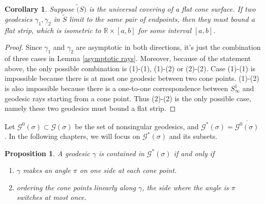 \documentclass[reqno]{amsart}
\theoremstyle{plain}
\newtheorem{cor}[thm]{Corollary}
\newtheorem{prop}[thm]{Proposition}
\theoremstyle{definition}
\theoremstyle{remark}
\theoremstyle{definition}
\newcommand{\R}{\mathbb R}
\newcommand{\?}{\textcolor{red}{?}}
\newcommand{\Gsigma}{\mathcal{G}(\sigma) }
\newcommand{\Gosigma}{\mathcal{G}^0(\sigma) }
\newcommand{\Gssigma}{\mathcal{G}^*(\sigma) }
\begin{document}
\begin{cor}\label{flat_strip}
Suppose $\tilde(S)$ is the universal covering of a flat cone surface. If two geodesics $\gamma_1,\gamma_2$ in $\tilde{S}$ limit to the same pair of endpoints, then they must bound a flat strip, which is isometric to $\R\times [a,b]$ for some interval $[a,b]$.
\end{cor}
\begin{proof}
Since $\gamma_1$ and $\gamma_2$ are asymptotic in both directions, it's just the combination of three cases in Lemma \ref{asymptotic rays}. Moreover, because of the statement above, the only possible combination is (1)-(1), (1)-(2) or (2)-(2). Case (1)-(1) is impossible because there is at most one geodesic between two cone points. (1)-(2) is also impossible because there is a one-to-one correspondence between $S^1_\infty$ and geodesic rays starting from a cone point. Thus (2)-(2) is the only possible case, namely these two geodesics must bound a flat strip.
\end{proof}


Let $\mathcal{G}^0(\sigma)\subset\Gsigma$ be the set of nonsingular geodesics, and $\mathcal{G}^*(\sigma)=\overline{\Gosigma}$. In the following chapters, we will focus on $\Gssigma$ and its subsets.

\begin{prop}\label{saddle}
A geodesic $\gamma$ is contained in $\Gssigma$ if and only if
\begin{enumerate}
    \item[(1)] $\gamma$ makes an angle $\pi$ on one side at each cone point.
    \item[(2)] ordering the cone points linearly along $\gamma$, the side where the angle is $\pi$ switches at most once.
\end{enumerate}
\end{prop}
\end{document}
